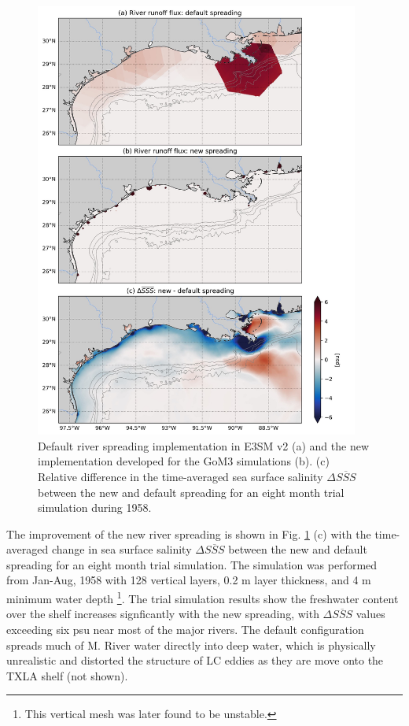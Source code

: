 \begin{figure}
\centerline{\includegraphics[width=0.95\textwidth]{figures/scgsr/spreading_comp.jpg}}
    \caption{Default river spreading implementation in E3SM v2 (a) and the new implementation developed for the GoM3 simulations (b). (c) Relative difference in the time-averaged sea surface salinity $\Delta \overline{SSS}$ between the new and default spreading for an eight month trial simulation during 1958.}
    \label{fig:spreading}
\end{figure}

The improvement of the new river spreading is shown in Fig. \ref{fig:spreading} (c) with the time-averaged change in sea surface salinity $\Delta \overline{SSS}$ between the new and default spreading for an eight month trial simulation. The simulation was performed from Jan-Aug, 1958 with 128 vertical layers, 0.2 m layer thickness, and 4 m minimum water depth \footnote{This vertical mesh was later found to be unstable.}. The trial simulation results show the freshwater content over the shelf increases signficantly with the new spreading, with $\Delta \overline{SSS}$ values exceeding six psu near most of the major rivers. The default configuration spreads much of M. River water directly into deep water, which is physically unrealistic and distorted the structure of LC eddies as they are move onto the TXLA shelf (not shown). 


